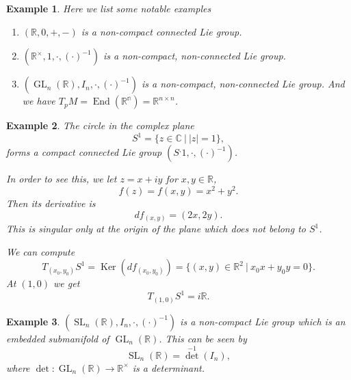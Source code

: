 \documentclass{article}
\newtheorem{example}{Example}[section]
\numberwithin{equation}{section}
\DeclareMathOperator{\Ker}{Ker}
\DeclareMathOperator{\End}{End}
\DeclareMathOperator{\GL}{GL}
\DeclareMathOperator{\SL}{SL}
\begin{document}
\begin{example}
Here we list some notable examples
\begin{enumerate}[1).]
\item $(\mathbb{R},0,+,-)$ is a non-compact connected Lie group.
\item $(\mathbb{R}^\times,1,\cdot,(\cdot)^{-1})$ is a non-compact, non-connected Lie group.
\item $(\GL_n(\mathbb{R}),I_n,\cdot,(\cdot)^{-1})$ is a non-compact, non-connected Lie group. And we have $T_pM = \End(\mathbb{R^n})=\mathbb{R}^{n\times n}$.
\end{enumerate}
\end{example}
\begin{example}
The circle in the complex plane
\begin{equation*}
S^1 =\{z\in\mathbb{C}\:|\: \vert z\vert = 1\},
\end{equation*}
forms a compact connected Lie group $(S^,1,\cdot,(\cdot)^{-1})$.\\
\par In order to see this, we let $z = x+iy$ for $x,y\in\mathbb{R}$, 
\begin{equation*}
f(z) = f(x,y) = x^2+y^2.
\end{equation*}
Then its derivative is 
\begin{equation*}
df_{(x,y)} = (2x,2y).
\end{equation*}
This is singular only at the origin of the plane which does not belong to $S^1$.\\
\par We can compute 
\begin{equation*}
T_{(x_0,y_0)}S^1 = \Ker(df_{(x_0,y_0)}) = \{(x,y)\in\mathbb{R}^2\:|\: x_0x+y_0y = 0\}.
\end{equation*}
At $(1,0)$ we get
\begin{equation*}
T_{(1,0)}S^1 = i\mathbb{R}.
\end{equation*}
\end{example}

\begin{example}
$(\SL_n(\mathbb{R}),I_n,\cdot,(\cdot)^{-1})$ is a non-compact Lie group which is an embedded submanifold of $\GL_n(\mathbb{R})$. This can be seen by
\begin{equation*}
\SL_n(\mathbb{R}) = \det^{-1}(I_n),
\end{equation*}
where $\det:\GL_n(\mathbb{R})\to\mathbb{R}^\times$ is a determinant.
\end{example}
\end{document}
